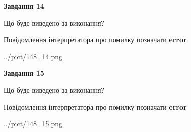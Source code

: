 \documentclass[11pt, ukrainian]{article}
\begin{document}
{\begin {large}
{\begin {center}\textbf{Завдання 14}\end {center}}\par
Що буде виведено за виконання? \par
Повідомлення інтерпретатора про помилку позначати \textbf{error}

\begin{center}
	{../pict/148_14.png}
\end{center}
\newpage

{\begin {center}\textbf{Завдання 15}\end {center}}\par
Що буде виведено за виконання? \par
Повідомлення інтерпретатора про помилку позначати \textbf{error}

\begin{center}
	{../pict/148_15.png}
\end{center}
\newpage

\end {large}}
\end{document}
